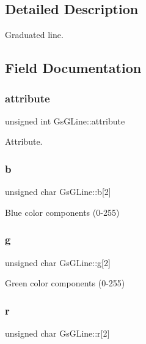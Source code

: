 \subsection{Detailed Description}
Graduated line. 

\subsection{Field Documentation}
\mbox{\label{structGsGLine_a075bc0bffec511d2f197127de13c8a0c}} 
\subsubsection{\texorpdfstring{attribute}{attribute}}
{\footnotesize\ttfamily unsigned int Gs\+G\+Line\+::attribute}



Attribute. 

\mbox{\label{structGsGLine_a1d749e52beea52a8da21ea04e70305c6}} 
\subsubsection{\texorpdfstring{b}{b}}
{\footnotesize\ttfamily unsigned char Gs\+G\+Line\+::b\mbox{[}2\mbox{]}}



Blue color components (0-\/255) 

\mbox{\label{structGsGLine_aa28614d6f820d65fe7e0146e11879f2f}} 
\subsubsection{\texorpdfstring{g}{g}}
{\footnotesize\ttfamily unsigned char Gs\+G\+Line\+::g\mbox{[}2\mbox{]}}



Green color components (0-\/255) 

\mbox{\label{structGsGLine_a769bcc099496430e50455ff903469be6}} 
\subsubsection{\texorpdfstring{r}{r}}
{\footnotesize\ttfamily unsigned char Gs\+G\+Line\+::r\mbox{[}2\mbox{]}}



